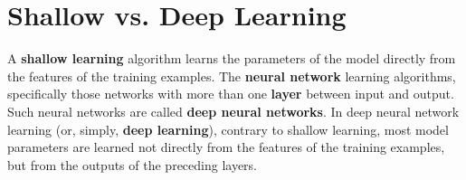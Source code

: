 \section{Shallow vs. Deep Learning}
A \textbf{shallow learning} algorithm learns the parameters of the model directly from the features of the training examples. The \textbf{neural network} learning algorithms, specifically those networks with more than one \textbf{layer} between input and output. Such neural networks are called \textbf{deep neural networks}. In deep neural network learning (or, simply, \textbf{deep learning}), contrary to shallow learning, most model parameters are learned not directly from the features of the training examples, but from the outputs of the preceding layers.
